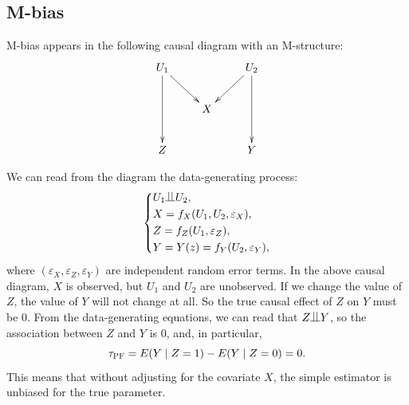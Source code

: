 \subsection{M-bias}
\label{section::m-bias}

M-bias appears in the following causal diagram with an M-structure:
$$
\xymatrix{
U_1 \ar[dd]\ar[dr] &&U_2 \ar[dd]\ar[dl] \\
&X& \\
Z   && Y 
}
$$

We can read from the diagram the data-generating process:
$$
\left\{ 
\begin{aligned}
&U_1 \ind U_2 ,\\
&X = f_X(U_1, U_2, \varepsilon_X),\\
&Z=   f_Z(U_1,  \varepsilon_Z) , \\
&Y=      Y(z) =  f_Y(U_2, \varepsilon_Y) ,
\end{aligned}
\right. 
$$
where $(\varepsilon_X, \varepsilon_Z, \varepsilon_Y) $ are independent random error terms. In the above causal diagram, $X$ is observed, but $U_1$ and $U_2$ are unobserved. 
If we change the value of $Z$, the value of $Y$ will not change at all. So the true causal effect of $Z$ on $Y$ must be $0$. From the data-generating equations, we can read that $Z\ind Y$, so the association between $Z$ and $Y$ is $0$, and, in particular, 
$$
\tau_\textsc{PF} = E(Y\mid Z=1) - E(Y\mid Z=0) = 0.
$$
This means that without adjusting for the covariate $X$, the simple estimator is unbiased for the true parameter. 

